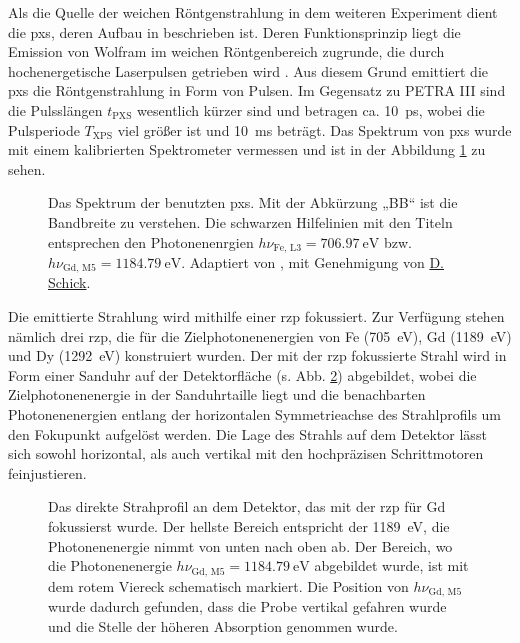 \noindent
Als die Quelle der weichen Röntgenstrahlung in dem weiteren Experiment dient die \gls{pxs}, deren Aufbau in \cite{schick_laser-driven_2021} beschrieben ist. Deren Funktionsprinzip liegt die Emission von Wolfram im weichen Röntgenbereich zugrunde, die durch hochenergetische Laserpulsen getrieben wird \cite{mantouvalou_high_2015}. Aus diesem Grund emittiert die \gls{pxs} die Röntgenstrahlung in Form von Pulsen. Im Gegensatz zu PETRA III sind die Pulsslängen $t_\text{PXS}$ wesentlich kürzer sind und betragen ca. \SI{10}{\pico\second}, wobei die Pulsperiode $T_\text{XPS}$ viel größer ist und \SI{10}{\milli\second} beträgt. Das Spektrum von \gls{pxs} wurde mit einem kalibrierten Spektrometer vermessen und ist in der Abbildung \ref{fig:pxs_spectrum} zu sehen.
\begin{figure}[H]
    \centering
    
    \caption{Das Spektrum der benutzten \gls{pxs}. Mit der Abkürzung „BB“ ist die Bandbreite zu verstehen. Die schwarzen Hilfelinien mit den Titeln entsprechen den Photonenenrgien $h\nu_{\text{Fe, L3}} = \SI{706.97}{\eV}$ bzw. $h\nu_{\text{Gd, M5}} = \SI{1184,79}{\eV}$. Adaptiert von \cite{schick_laser-driven_2021}, mit Genehmigung von \href{https://orcid.org/0000-0001-7988-6489}{D. Schick}.}
    \label{fig:pxs_spectrum}
\end{figure}
\noindent
Die emittierte Strahlung wird mithilfe einer \gls{rzp} fokussiert. Zur Verfügung stehen nämlich drei \gls{rzp}, die für die Zielphotonenenergien von Fe (\SI{705}{\eV}), Gd (\SI{1189}{\eV}) und Dy (\SI{1292}{\eV}) konstruiert wurden. Der mit der \gls{rzp} fokussierte Strahl wird in Form einer Sanduhr auf der Detektorfläche (s. Abb. \ref{fig:butterfly_moench}) abgebildet, wobei die Zielphotonenenergie in der Sanduhrtaille liegt und die benachbarten Photonenenergien entlang der horizontalen Symmetrieachse des Strahlprofils um den Fokupunkt aufgelöst werden. Die Lage des Strahls auf dem Detektor lässt sich sowohl horizontal, als auch vertikal mit den hochpräzisen Schrittmotoren feinjustieren.
\begin{figure}[H]
    \centering
    
    \caption{Das direkte Strahprofil an dem Detektor, das mit der \gls{rzp} für Gd fokussierst wurde. Der hellste Bereich entspricht der \SI{1189}{\eV}, die Photonenenergie nimmt von unten nach oben ab. Der Bereich, wo die Photonenenergie $h\nu_{\text{Gd, M5}} = \SI{1184,79}{\eV}$ abgebildet wurde, ist mit dem rotem Viereck schematisch markiert. Die Position von $h\nu_{\text{Gd, M5}}$ wurde dadurch gefunden, dass die Probe vertikal gefahren wurde und die Stelle der höheren Absorption genommen wurde.}
    \label{fig:butterfly_moench}
\end{figure}
